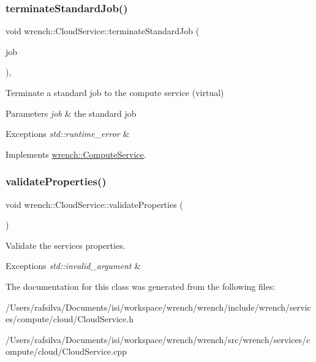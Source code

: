 \subsubsection{\texorpdfstring{terminate\+Standard\+Job()}{terminateStandardJob()}}
{\footnotesize\ttfamily void wrench\+::\+Cloud\+Service\+::terminate\+Standard\+Job (\begin{DoxyParamCaption}\item[{\hyperlink{classwrench_1_1_standard_job}{Standard\+Job} $\ast$}]{job }\end{DoxyParamCaption})\hspace{0.3cm}{\ttfamily [override]}, {\ttfamily [virtual]}}



Terminate a standard job to the compute service (virtual) 


\begin{DoxyParams}{Parameters}
{\em job} & the standard job\\
\hline
\end{DoxyParams}

\begin{DoxyExceptions}{Exceptions}
{\em std\+::runtime\+\_\+error} & \\
\hline
\end{DoxyExceptions}


Implements \hyperlink{classwrench_1_1_compute_service}{wrench\+::\+Compute\+Service}.

\mbox{\label{classwrench_1_1_cloud_service_af2d39456e9526ef63d077b76166fa1da}} 
\subsubsection{\texorpdfstring{validate\+Properties()}{validateProperties()}}
{\footnotesize\ttfamily void wrench\+::\+Cloud\+Service\+::validate\+Properties (\begin{DoxyParamCaption}{ }\end{DoxyParamCaption})}



Validate the service\textquotesingle{}s properties. 


\begin{DoxyExceptions}{Exceptions}
{\em std\+::invalid\+\_\+argument} & \\
\hline
\end{DoxyExceptions}


The documentation for this class was generated from the following files\+:\begin{DoxyCompactItemize}
\item 
/\+Users/rafsilva/\+Documents/isi/workspace/wrench/wrench/include/wrench/services/compute/cloud/Cloud\+Service.\+h\item 
/\+Users/rafsilva/\+Documents/isi/workspace/wrench/wrench/src/wrench/services/compute/cloud/Cloud\+Service.\+cpp\end{DoxyCompactItemize}
